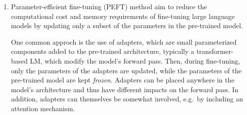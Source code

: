 \documentclass[11pt,a4paper]{article}
\begin{document}
\begin{enumerate}[label=(\alph*)]
    \item Parameter-efficient fine-tuning (PEFT) method aim to reduce the
          computational cost and memory requirements of fine-tuning large
          language models by updating only a subset of the parameters in the
          pre-trained model.

          One common approch is the use of adapters, which are small
          parameterized components added to the pre-trained architecture,
          typically a transformer-based LM, which modify the model's forward
          pass.
          Then, during fine-tuning, only the parameters of the adapters are
          updated, while the parameters of the pre-trained model are kept
          \emph{frozen}.
          Adapters can be placed anywhere in the model's architecture and thus
          have different impacts on the forward pass.
          In addition, adapters can themselves be somewhat involved, e.g.\ by
          including an attention mechanism.


\end{enumerate}
\end{document}
